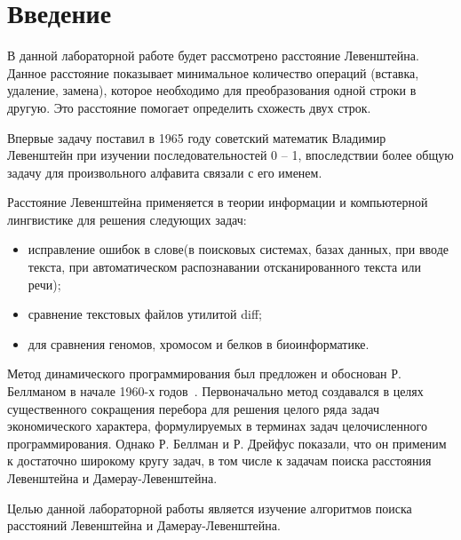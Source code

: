 \chapter*{Введение}

В данной лабораторной работе будет рассмотрено расстояние Левенштейна.
Данное расстояние показывает минимальное количество операций (вставка, удаление, замена), которое необходимо для преобразования одной строки в другую. Это расстояние помогает определить схожесть двух строк.

Впервые задачу поставил в 1965 году советский математик Владимир Левенштейн при изучении последовательностей 0 -- 1, впоследствии более общую задачу для произвольного алфавита связали с его именем.

Расстояние Левенштейна применяется в теории информации и компьютерной лингвистике для решения следующих задач:
\begin{itemize}[label=---]
	\item исправление ошибок в слове(в поисковых системах, базах данных, при вводе текста, при автоматическом распознавании отсканированного текста или речи);
	\item сравнение текстовых файлов утилитой diff;
	\item для сравнения геномов, хромосом и белков в биоинформатике.
\end{itemize}

Метод динамического программирования был предложен и обоснован Р. Беллманом в начале 1960-х годов~\cite{ulianov}.
Первоначально метод создавался в целях существенного сокращения перебора для решения целого ряда задач экономического характера, формулируемых в терминах задач целочисленного программирования.
Однако Р. Беллман и Р. Дрейфус показали, что он применим к достаточно широкому кругу задач, в том числе к задачам поиска расстояния Левенштейна и Дамерау-Левенштейна.

Целью данной лабораторной работы является изучение алгоритмов поиска расстояний Левенштейна и Дамерау-Левенштейна.

